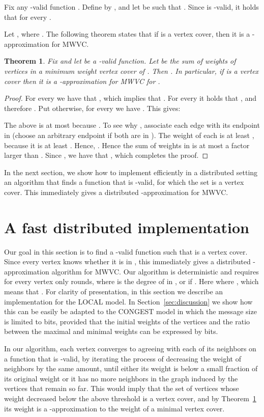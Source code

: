 \documentclass[11pt]{article}
\newtheorem{theorem}{Theorem}[section]
\begin{document}
Fix any -valid function . Define  by , and let  be such that . Since  is -valid, it holds that  for every .

Let , where . The following theorem states that if  is a vertex cover, then it is a -approximation for MWVC.
\begin{theorem}
\label{thm:lr}
Fix  and let  be a -valid function. Let  be the sum of weights of vertices in a minimum weight vertex cover  of . Then . In particular, if  is a vertex cover then it is a -approximation for MWVC for .
\end{theorem}

\begin{proof}
For every  we have that , which implies that . For every  it holds that , and therefore . Put otherwise, for every  we have . This gives:

The above is at most  because . To see why , associate each edge  with its endpoint  in  (choose an arbitrary endpoint if both are in ). The weight  of each  is at least , because it is at least . Hence, .
Hence the sum of weights in  is at most a factor  larger than . Since , we have that , which completes the proof.
\end{proof}

In the next section, we show how to implement efficiently in a distributed setting an algorithm that finds a function  that is -valid, for which the set  is a vertex cover. This immediately gives a distributed -approximation for MWVC.


\section{A fast distributed implementation}
\label{sec:dist}
Our goal in this section is to find a -valid function  such that  is a vertex cover. Since every vertex knows whether it is in , this immediately gives a distributed -approximation algorithm for MWVC. Our algorithm is deterministic and requires for every vertex  only  rounds, where  is the degree of  in , or  if . Here  where , which means that .
For clarity of presentation, in this section we describe an implementation for the LOCAL model. In Section~\ref{sec:discussion} we show how this can be easily be adapted to the CONGEST model in which the message size is limited to  bits, provided that the initial weights of the vertices and the ratio between the maximal and minimal weights can be expressed by  bits.

In our algorithm, each vertex converges to agreeing with each of its neighbors on a function  that is -valid, by iterating the process of decreasing the weight of neighbors by the same amount, until either its weight is below a small fraction of its original weight or it has no more neighbors in the graph induced by the vertices that remain so far. This would imply that the set of vertices whose weight decreased below the above threshold is a vertex cover, and by Theorem~\ref{thm:lr} its weight is a -approximation to the weight of a minimal vertex cover.
\end{document}
